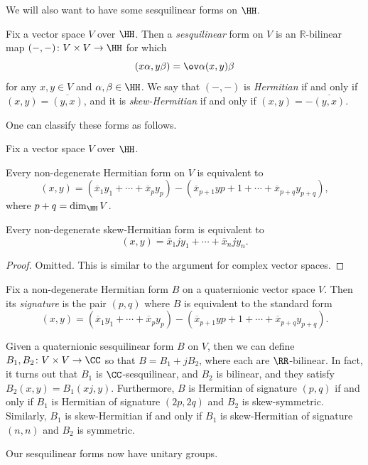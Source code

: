\documentclass[../notes.tex]{subfiles}
\begin{document}
We will also want to have some sesquilinear forms on $\HH$.
\begin{definition}[sesquilinear]
	Fix a vector space $V$ over $\HH$. Then a \textit{sesquilinear} form on $V$ is an $\mathbb R$-bilinear map $(-,-)\colon V\times V\to\HH$ for which
	\[(x\alpha,y\beta)=\ov\alpha(x,y)\beta\]
	for any $x,y\in V$ and $\alpha,\beta\in\HH$. We say that $(-,-)$ is \textit{Hermitian} if and only if $(x,y)=\overline{(y,x)}$, and it is \textit{skew-Hermitian} if and only if $(x,y)=-\overline{(y,x)}$.
\end{definition}
One can classify these forms as follows.
\begin{proposition}
	Fix a vector space $V$ over $\HH$.
	\begin{listalph}
		\item Every non-degenerate Hermitian form on $V$ is equivalent to
		\[(x,y)=(\overline x_1y_1+\cdots+\overline x_py_p)-(\overline x_{p+1}y{p+1}+\cdots+\overline x_{p+q}y_{p+q}),\]
		where $p+q=\dim_\HH V$.
		\item Every non-degenerate skew-Hermitian form is equivalent to
		\[(x,y)=\overline x_1jy_1+\cdots+\overline x_njy_n.\]
	\end{listalph}
\end{proposition}
\begin{proof}
	Omitted. This is similar to the argument for complex vector spaces.
\end{proof}
\begin{definition}[signature]
	Fix a non-degenerate Hermitian form $B$ on a quaternionic vector space $V$. Then its \textit{signature} is the pair $(p,q)$ where $B$ is equivalent to the standard form
	\[(x,y)=(\overline x_1y_1+\cdots+\overline x_py_p)-(\overline x_{p+1}y{p+1}+\cdots+\overline x_{p+q}y_{p+q}).\]
\end{definition}
\begin{remark} \label{rem:decompose-quaternionic-sesquilinear}
	Given a quaternionic sesquilinear form $B$ on $V$, then we can define $B_1,B_2\colon V\times V\to\CC$ so that $B=B_1+jB_2$, where each are $\RR$-bilinear. In fact, it turns out that $B_1$ is $\CC$-sesquilinear, and $B_2$ is bilinear, and they satisfy $B_2(x,y)=B_1(xj,y)$. Furthermore, $B$ is Hermitian of signature $(p,q)$ if and only if $B_1$ is Hermitian of signature $(2p,2q)$ and $B_2$ is skew-symmetric. Similarly, $B_1$ is skew-Hermitian if and only if $B_1$ is skew-Hermitian of signature $(n,n)$ and $B_2$ is symmetric.
\end{remark}
Our sesquilinear forms now have unitary groups.
\end{document}
